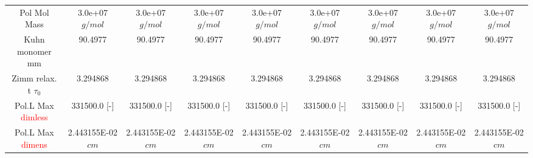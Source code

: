 \documentclass[]{article}
\begin{document}
\begin{table}
\begin{tabular}{ccccccccc}
Pol Mol Mass& 3.0e+07 $g/mol$& 3.0e+07 $g/mol$& 3.0e+07 $g/mol$& 3.0e+07 $g/mol$& 3.0e+07 $g/mol$& 3.0e+07 $g/mol$& 3.0e+07 $g/mol$& 3.0e+07 $g/mol$\\ 

Kuhn monomer mm &  90.4977 &  90.4977 &  90.4977 &  90.4977 &  90.4977 &  90.4977 &  90.4977 &  90.4977\\ 
\hline

Zimm relax. t $\tau_0$ &   3.294868 &   3.294868 &   3.294868 &   3.294868 &   3.294868 &   3.294868 &   3.294868 &   3.294868\\ 
\hline

Pol.L Max \textcolor{red}{dimless} &   331500.0 [-] &   331500.0 [-] &   331500.0 [-] &   331500.0 [-] &   331500.0 [-] &   331500.0 [-] &   331500.0 [-] &   331500.0 [-]\\ 

Pol.L Max \textcolor{red}{dimens} &   2.443155E-02 $cm$ &   2.443155E-02 $cm$ &   2.443155E-02 $cm$ &   2.443155E-02 $cm$ &   2.443155E-02 $cm$ &   2.443155E-02 $cm$ &   2.443155E-02 $cm$ &   2.443155E-02 $cm$\\ 


\end{tabular}
\end{table}
\end{document}
